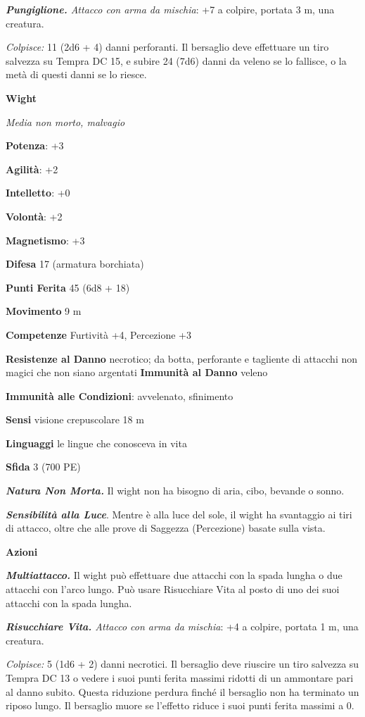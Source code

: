 \begin{multicols}{2}
\emph{\textbf{Pungiglione.} Attacco con arma da mischia}: +7 a colpire,
portata 3 m, una creatura.

\emph{Colpisce:} 11 (2d6 + 4) danni perforanti. Il bersaglio deve
effettuare un tiro salvezza su Tempra DC 15, e subire 24 (7d6)
danni da veleno se lo fallisce, o la metà di questi danni se lo riesce.



\textbf{Wight}

\emph{Media non morto, malvagio}

\textbf{Potenza}: +3

\textbf{Agilità}: +2

\textbf{Intelletto}: +0

\textbf{Volontà}: +2

\textbf{Magnetismo}: +3

\textbf{Difesa} 17 (armatura borchiata)

\textbf{Punti Ferita} 45 (6d8 + 18)

\textbf{Movimento} 9 m

\textbf{Competenze} Furtività +4, Percezione +3

\textbf{Resistenze al Danno} necrotico; da botta, perforante e
tagliente di attacchi non magici che non siano argentati
\textbf{Immunità al Danno} veleno

\textbf{Immunità alle Condizioni}: avvelenato, sfinimento

\textbf{Sensi} visione crepuscolare 18 m

\textbf{Linguaggi} le lingue che conosceva in vita

\textbf{Sfida} 3 (700 PE)\smallskip

\emph{\textbf{Natura Non Morta.}} Il wight non ha bisogno di aria, cibo,
bevande o sonno.

\emph{\textbf{Sensibilità alla Luce}}. Mentre è alla luce del sole, il
wight ha svantaggio ai tiri di attacco, oltre che alle prove di Saggezza
(Percezione) basate sulla vista.

\smallskip\textbf{Azioni}

\emph{\textbf{Multiattacco.}} Il wight può effettuare due attacchi con
la spada lungha o due attacchi con l'arco lungo. Può usare Risucchiare
Vita al posto di uno dei suoi attacchi con la spada lungha.

\emph{\textbf{Risucchiare Vita.} Attacco con arma da mischia}: +4 a
colpire, portata 1 m, una creatura.

\emph{Colpisce:} 5 (1d6 + 2) danni necrotici. Il bersaglio deve riuscire
un tiro salvezza su Tempra DC 13 o vedere i suoi punti ferita
massimi ridotti di un ammontare pari al danno subito. Questa riduzione
perdura finché il bersaglio non ha terminato un riposo lungo. Il
bersaglio muore se l'effetto riduce i suoi punti ferita massimi a 0.


\end{multicols}
